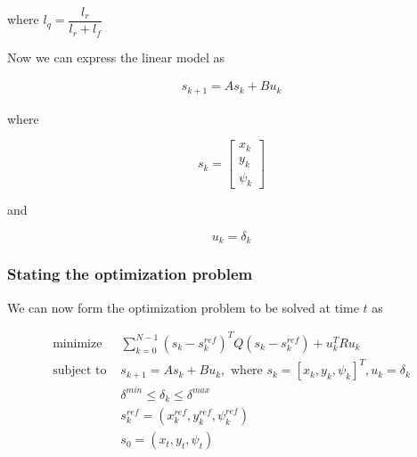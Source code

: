 where $l_q = \dfrac{l_r}{l_r + l_f}$


Now we can express the linear model as

\begin{align}
  s_{k+1} = A s_k + B u_k
\end{align}

where

\begin{equation}
  s_k=
  \begin{bmatrix}
    x_{k} \\
    y_{k} \\
    \psi_{k}
  \end{bmatrix}
\end{equation}

and

\begin{equation}
  u_k= \delta_{k}
\end{equation}



\subsubsection{Stating the optimization problem}

We can now form the optimization problem to be solved at time $t$ as

\begin{align}
  \text{minimize }    & \sum\limits_{k=0}^{N-1} (s_k - s_k^{ref})^T Q (s_k - s_k^{ref}) + u_k^T R u_k \\
  \text{subject to }  & s_{k+1} = A s_k + B u_k, \text{ where } s_k = [x_k, y_k, \psi_k]^T, u_k = \delta_k \\
                      & \delta^{min} \leq \delta_k \leq \delta^{max} \\
                      & s_k^{ref} = (x_k^{ref}, y_k^{ref}, \psi_k^{ref}) \\
                      & s_0 = (x_t, y_t, \psi_t)
\end{align}
